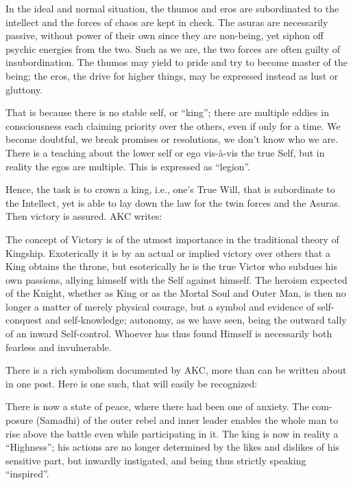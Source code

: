 In the ideal and normal situation, the thumos and eros are subordinated to the intellect and the forces of chaos are kept in check. The asuras are necessarily passive, without power of their own since they are non-being, yet siphon off psychic energies from the two. Such as we are, the two forces are often guilty of insubordination. The thumos may yield to pride and try to become master of the being; the eros, the drive for higher things, may be expressed instead as lust or gluttony.

That is because there is no stable self, or ``king''; there are multiple eddies in consciousness each claiming priority over the others, even if only for a time. We become doubtful, we break promises or resolutions, we don't know who we are. There is a teaching about the lower self or ego vis-à-vis the true Self, but in reality the egos are multiple. This is expressed as ``legion''.

Hence, the task is to crown a king, i.e., one's True Will, that is subordinate to the Intellect, yet is able to lay down the law for the twin forces and the Asuras. Then victory is assured. AKC writes:

\begin{quotex}
The concept of Victory is of the utmost importance in the traditional theory of Kingship. Exoterically it is by an actual or implied victory over others that a King obtains the throne, but esoterically he is the true Victor who subdues his own passions, allying himself with the Self against himself. The heroism expected of the Knight, whether as King or as the Mortal Soul and Outer Man, is then no longer a matter of merely physical courage, but a symbol and evidence of self-conquest and self-knowledge; autonomy, as we have seen, being the outward tally of an inward Self-control. Whoever has thus found Himself is necessarily both fearless and invulnerable.
\end{quotex}


There is a rich symbolism documented by AKC, more than can be written about in one post. Here is one such, that will easily be recognized:

\begin{quotex}
There is now a state of peace, where there had been one of anxiety. The com-posure (Samadhi) of the outer rebel and inner leader enables the whole man to rise above the battle even while participating in it. The king is now in reality a ``Highness''; his actions are no longer determined by the likes and dislikes of his sensitive part, but inwardly instigated, and being thus strictly speaking ``inspired''.
\end{quotex}


